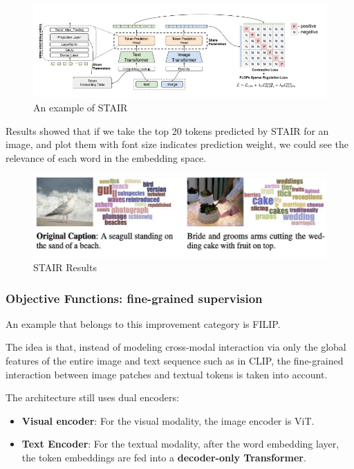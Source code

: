 \begin{figure}[H]
    \centering
    \includegraphics[width=1\linewidth]{tikz/STAIR.png}
    \caption{An example of STAIR}
    \label{fig:STAIR}
\end{figure}


Results showed that if we take the top 20 tokens predicted by STAIR for an image, and plot them with font size indicates prediction weight, we could see the relevance of each word in the embedding space.

\begin{figure}[H]
    \centering
    \includegraphics[width=1\linewidth]{tikz/STAIR Results.png}
    \caption{STAIR Results}
    \label{fig:STAIR-Results}
\end{figure}



\subsubsection{Objective Functions: fine-grained supervision}

An example that belongs to this improvement category is FILIP. 

The idea is that, instead of modeling cross-modal interaction via only the global features of the entire image and text sequence such as in CLIP, the fine-grained interaction between image
patches and textual tokens is taken into account.

The architecture still uses dual encoders:
\begin{itemize}
    \item \textbf{Visual encoder}: For the visual modality, the image encoder is ViT.
    \vspace{5 pt}
    \item \textbf{Text Encoder}: For the textual modality, after the word embedding layer, the token embeddings are fed into a \textbf{decoder-only Transformer}.
\end{itemize}

